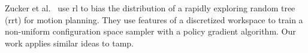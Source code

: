 Zucker et al.~\cite{workspacebias} use {\sc rl} to bias the
distribution of a rapidly exploring random tree ({\sc rrt}) for motion
planning. They use features of a discretized workspace to train a
non-uniform configuration space sampler with a policy gradient
algorithm. Our work applies similar ideas to {\sc tamp}.

